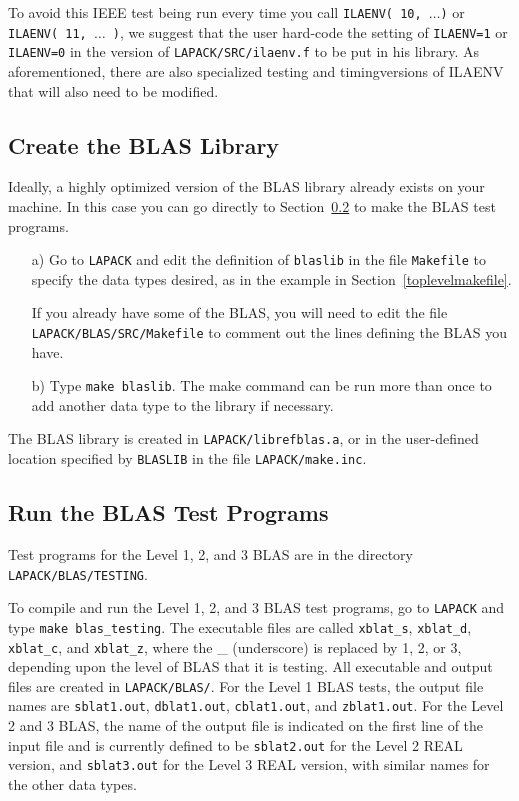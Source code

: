 \documentclass[11pt]{report}
\begin{document}
To avoid this IEEE test being run every time you call
\texttt{ILAENV( 10, $\ldots$)} or \texttt{ILAENV( 11, $\ldots$ )}, we suggest
that the user hard-code the setting of
\texttt{ILAENV=1} or \texttt{ILAENV=0} in the version of \texttt{LAPACK/SRC/ilaenv.f} to be put in
his library.  As aforementioned, there are also specialized testing and
timing\footnotemark[\value{footnote}] versions of ILAENV that will also need to be modified.

\subsection{Create the BLAS Library}

Ideally, a highly optimized version of the BLAS library already
exists on your machine.
In this case you can go directly to Section~\ref{testblas} to
make the BLAS test programs.

\begin{itemize}
\item[a)]
Go to \texttt{LAPACK} and edit the definition of \texttt{blaslib} in the
file \texttt{Makefile} to specify the data types desired, as in the example
in Section~\ref{toplevelmakefile}.

If you already have some of the BLAS, you will need to edit the file
\texttt{LAPACK/BLAS/SRC/Makefile} to comment out the lines
defining the BLAS you have.

\item[b)]
Type \texttt{make blaslib}.
The make command can be run more than once to add another
data type to the library if necessary.
\end{itemize}

\noindent
The BLAS library is created in \texttt{LAPACK/librefblas.a},
or in the user-defined location specified by \texttt{BLASLIB} in the file
\texttt{LAPACK/make.inc}.

\subsection{Run the BLAS Test Programs}\label{testblas}

Test programs for the Level 1, 2, and 3 BLAS are in the directory
\texttt{LAPACK/BLAS/TESTING}.

To compile and run the Level 1, 2, and 3 BLAS test programs,
go to \texttt{LAPACK} and type \texttt{make blas\_testing}.  The executable
files are called \texttt{xblat\_s}, \texttt{xblat\_d}, \texttt{xblat\_c}, and
\texttt{xblat\_z}, where the \_ (underscore) is replaced by 1, 2, or 3,
depending upon the level of BLAS that it is testing.  All executable and
output files are created in \texttt{LAPACK/BLAS/}.
For the Level 1 BLAS tests, the output file names are \texttt{sblat1.out},
\texttt{dblat1.out}, \texttt{cblat1.out}, and \texttt{zblat1.out}.  For the Level
2 and 3 BLAS, the name of the output file is indicated on the first line of the
input file and is currently defined to be \texttt{sblat2.out} for
the Level 2 REAL version, and \texttt{sblat3.out} for the Level 3 REAL
version, with similar names for the other data types.
\end{document}
